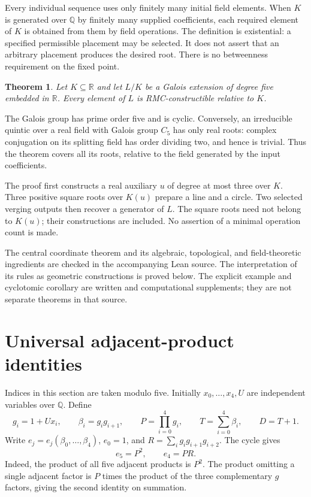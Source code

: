 \documentclass[noproofs]{rmj-public}
\newtheorem{theorem}[thm]{Theorem}
\theoremstyle{definition}
\numberwithin{equation}{section}
\newcommand{\R}{\mathbb R}
\newcommand{\Q}{\mathbb Q}
\begin{document}
Every individual sequence uses only finitely many initial field elements.
When $K$ is generated over $\Q$ by finitely many supplied coefficients,
each required element of $K$ is obtained from them by field operations.
The definition is existential: a specified permissible placement may be
selected. It does not assert that an arbitrary placement produces the
desired root. There is no betweenness requirement on the fixed point.

\begin{theorem}\label{thm:main}
Let $K\subseteq\R$ and let $L/K$ be a Galois extension of degree five
embedded in $\R$. Every element of $L$ is RMC-constructible relative to $K$.
\end{theorem}

The Galois group has prime order five and is cyclic. Conversely, an
irreducible quintic over a real field with Galois group $C_5$ has only real
roots: complex conjugation on its splitting field has order dividing two,
and hence is trivial. Thus the theorem covers all its roots, relative to
the field generated by the input coefficients.

The proof first constructs a real auxiliary $u$ of degree at most three
over $K$. Three positive square roots over $K(u)$ prepare a line and a
circle. Two selected verging outputs then recover a generator of $L$.
The square roots need not belong to $K(u)$; their constructions are
included. No assertion of a minimal operation count is made.

The central coordinate theorem and its algebraic, topological, and
field-theoretic ingredients are checked in the accompanying Lean source.
The interpretation of its rules as geometric constructions is proved
below. The explicit example and cyclotomic corollary are written and
computational supplements; they are not separate theorems in that source.

\section{Universal adjacent-product identities}\label{sec:algebra}

Indices in this section are taken modulo five. Initially
$x_0,\ldots,x_4,U$ are independent variables over $\Q$. Define
\begin{equation}\label{eq:g}
g_i=1+Ux_i,\qquad \beta_i=g_ig_{i+1},\qquad
P=\prod_{i=0}^4g_i,\qquad T=\sum_{i=0}^4\beta_i,\qquad D=T+1.
\end{equation}
Write $e_j=e_j(\beta_0,\ldots,\beta_4)$, $e_0=1$, and
$R=\sum_i g_ig_{i+1}g_{i+2}$. The cycle gives
\begin{equation}\label{eq:products}
e_5=P^2,\qquad e_4=PR.
\end{equation}
Indeed, the product of all five adjacent products is $P^2$. The product
omitting a single adjacent factor is $P$ times the product of the three
complementary $g$ factors, giving the second identity on summation.
\end{document}
